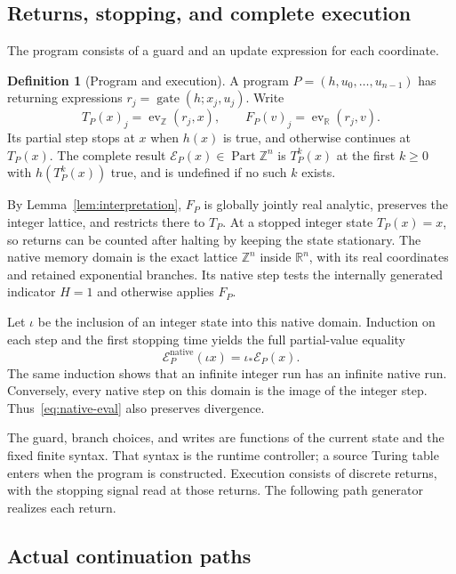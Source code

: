 \documentclass[11pt]{article}
\numberwithin{equation}{section}
\theoremstyle{definition}
\newtheorem{definition}[theorem]{Definition}
\theoremstyle{remark}
\newcommand{\Z}{\mathbb Z}
\newcommand{\R}{\mathbb R}
\newcommand{\Part}{\operatorname{Part}}
\newcommand{\ev}{\operatorname{ev}}
\newcommand{\Gate}{\operatorname{gate}}
\begin{document}
\subsection{Returns, stopping, and complete execution}

The program consists of a guard and an update expression for each
coordinate.
\begin{definition}[Program and execution]\label{def:program}
A program $P=(h,u_0,\ldots,u_{n-1})$ has returning expressions
$r_j=\Gate(h;x_j,u_j)$. Write
\begin{equation}\label{eq:return}
 T_P(x)_j=\ev_\Z(r_j,x),\qquad
 F_P(v)_j=\ev_\R(r_j,v).
\end{equation}
Its partial step stops at $x$ when $h(x)$ is true, and otherwise continues
at $T_P(x)$. The complete result $\mathcal E_P(x)\in\Part\Z^n$ is
$T_P^k(x)$ at the first $k\geq0$ with $h(T_P^k(x))$ true, and is
undefined if no such $k$ exists.
\end{definition}

By Lemma~\ref{lem:interpretation}, $F_P$ is globally jointly real
analytic, preserves the integer lattice, and restricts there to $T_P$.
At a stopped integer state $T_P(x)=x$, so returns can be counted after
halting by keeping the state stationary. The native memory domain is
the exact lattice $\Z^n$ inside $\R^n$, with its real coordinates and
retained exponential branches. Its native step tests the internally
generated indicator $H=1$ and otherwise applies $F_P$.

Let $\iota$ be the inclusion of an integer state into this native domain.
Induction on each step and the first stopping time yields the full
partial-value equality
\begin{equation}\label{eq:native-eval}
 \mathcal E_P^{\mathrm{native}}(\iota x)=\iota_*\mathcal E_P(x).
\end{equation}
The same induction shows that an infinite integer run has an infinite
native run. Conversely, every native step on this domain is the image of
the integer step. Thus~\eqref{eq:native-eval} also preserves divergence.

The guard, branch choices, and writes are functions of the current
state and the fixed finite syntax. That syntax is the runtime
controller; a source Turing table enters when the program is constructed.
Execution consists of discrete returns, with the stopping signal read
at those returns. The following path generator realizes each return.

\subsection{Actual continuation paths}
\end{document}
